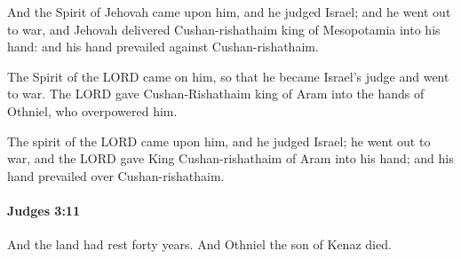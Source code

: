 			\begin{versebox}
					\item[BHS] 
					\item[ASV] And the Spirit of Jehovah came upon him, and he judged Israel; and he went out to war, and Jehovah delivered Cushan-rishathaim king of Mesopotamia into his hand: and his hand prevailed against Cushan-rishathaim.
					\item[NIV] The Spirit of the LORD came on him, so that he became Israel’s judge and went to war. The LORD gave Cushan-Rishathaim king of Aram into the hands of Othniel, who overpowered him.
					\item[NRSV] The spirit of the LORD came upon him, and he judged Israel; he went out to war, and the LORD gave King Cushan-rishathaim of Aram into his hand; and his hand prevailed over Cushan-rishathaim.
			\end{versebox}

		\paragraph{Judges 3:11} %
			\label{JUDGES-3-11}

			And the land had rest forty years. And Othniel the son of Kenaz died.

